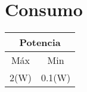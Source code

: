 \section{Consumo}
\begin{center}
\begin{tabular}{|c|c|}
\hline 
\multicolumn{2}{|c|}{Potencia}\tabularnewline
\hline 
\hline 
Máx & Min\tabularnewline
\hline 
2(W) & 0.1(W)\tabularnewline
\hline 
\end{tabular}
\par\end{center}
